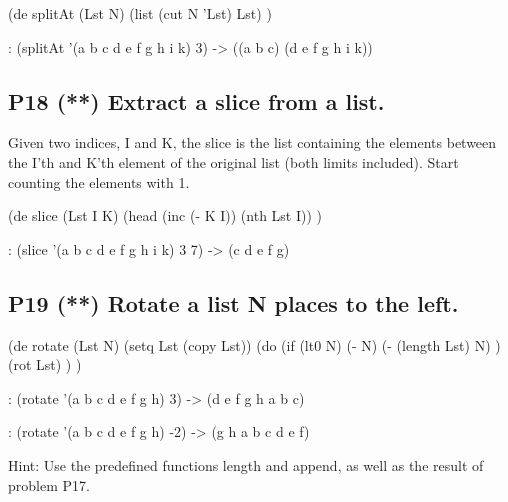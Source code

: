 \begin{wideverbatim}

(de splitAt (Lst N)
   (list (cut N 'Lst) Lst) )

\end{wideverbatim}

\begin{wideverbatim}
   : (splitAt '(a b c d e f g h i k) 3)
   -> ((a b c) (d e f g h i k))
\end{wideverbatim}


\pagebreak{}
\subsection*{{P18} (**) Extract a slice from a list.}
\label{sec:99-problems-P18}

Given two indices, I and K, the slice is the list containing the
elements between the I'th and K'th element of the original list (both
limits included). Start counting the elements with 1.

\begin{wideverbatim}

(de slice (Lst I K)
   (head (inc (- K I)) (nth Lst I)) )

\end{wideverbatim}

\begin{wideverbatim}
   : (slice '(a b c d e f g h i k) 3 7)
   -> (c d e f g)
\end{wideverbatim}


\subsection*{{P19} (**) Rotate a list N places to the
left.}
\label{sec:99-problems-P19}

\begin{wideverbatim}

(de rotate (Lst N)
   (setq Lst (copy Lst))
   (do
      (if (lt0 N)
         (- N)
         (- (length Lst) N) )
      (rot Lst) ) )

\end{wideverbatim}

\begin{wideverbatim}
   : (rotate '(a b c d e f g h) 3)
   -> (d e f g h a b c)

   : (rotate '(a b c d e f g h) -2)
   -> (g h a b c d e f)
\end{wideverbatim}

Hint: Use the predefined functions length and append, as well as the
result of problem P17.


